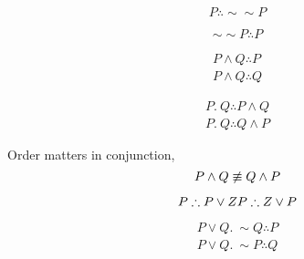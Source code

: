 \documentclass[11pt]{article}
\begin{document}
		\begin{rules}
			\begin{equation}
				P \therefore \sim \sim P
			\end{equation}
		\end{rules}
		
		\begin{rules}
			\begin{equation}
				\sim \sim P \therefore P
			\end{equation}
		\end{rules}
		
		\begin{rules}
			\begin{gather}
				P \land Q \therefore P \\
				P \land Q \therefore Q
			\end{gather}
		\end{rules}
		
		\begin{rules}
			\begin{gather}
				P.\ Q \therefore P \land Q \\
				P.\ Q \therefore Q \land P
			\end{gather}
		\end{rules}
		
		\begin{remark}
			Order matters in conjunction,
			\begin{equation}
				P \land Q \centernot \equiv Q \land P
			\end{equation}
		\end{remark}
		
		\begin{rules}
			\begin{equation}
				P \therefore P \lor Z \\
				P \therefore Z \lor P
			\end{equation}
		\end{rules}
		
		\begin{rules}
			\begin{gather}
				P \lor Q.\ \sim Q \therefore P \\
				P \lor Q.\ \sim P \therefore Q
			\end{gather}
		\end{rules}
		
\end{document}

